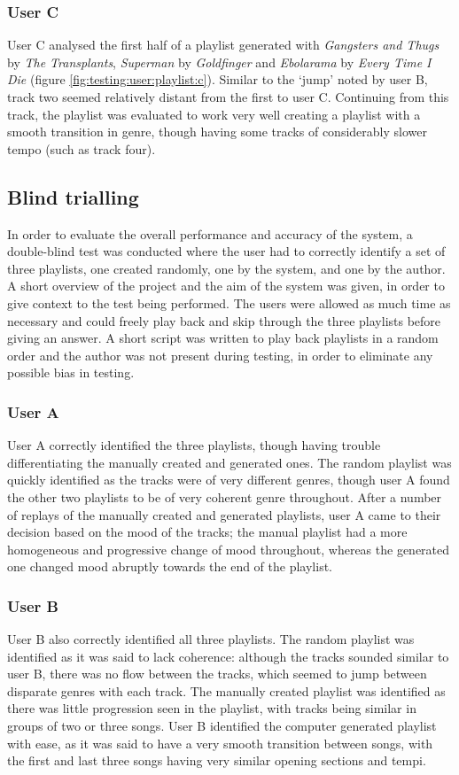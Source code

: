 \subsubsection{User C}
User C analysed the first half of a playlist generated with \emph{Gangsters and Thugs} by \emph{The Transplants}, \emph{Superman} by \emph{Goldfinger} and \emph{Ebolarama} by \emph{Every Time I Die} (figure \ref{fig:testing:user:playlist:c}). Similar to the `jump' noted by user B, track two seemed relatively distant from the first to user C. Continuing from this track, the playlist was evaluated to work very well creating a playlist with a smooth transition in genre, though having some tracks of considerably slower tempo (such as track four).

\subsection{Blind trialling}
In order to evaluate the overall performance and accuracy of the system, a double-blind test was conducted where the user had to correctly identify a set of three playlists, one created randomly, one by the system, and one by the author. A short overview of the project and the aim of the system was given, in order to give context to the test being performed. The users were allowed as much time as necessary and could freely play back and skip through the three playlists before giving an answer. A short script was written to play back playlists in a random order and the author was not present during testing, in order to eliminate any possible bias in testing.
\subsubsection{User A}
User A correctly identified the three playlists, though having trouble differentiating the manually created and generated ones. The random playlist was quickly identified as the tracks were of very different genres, though user A found the other two playlists to be of very coherent genre throughout. After a number of replays of the manually created and generated playlists, user A came to their decision based on the mood of the tracks; the manual playlist had a more homogeneous and progressive change of mood throughout, whereas the generated one changed mood abruptly towards the end of the playlist.
\subsubsection{User B}
User B also correctly identified all three playlists. The random playlist was identified as it was said to lack coherence: although the tracks sounded similar to user B, there was no flow between the tracks, which seemed to jump between disparate genres with each track. The manually created playlist was identified as there was little progression seen in the playlist, with tracks being similar in groups of two or three songs. User B identified the computer generated playlist with ease, as it was said to have a very smooth transition between songs, with the first and last three songs having very similar opening sections and tempi.
